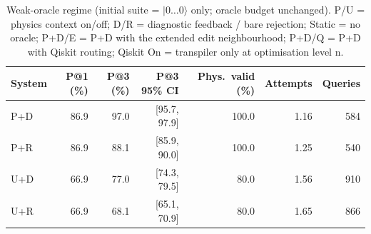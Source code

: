 \begin{table}[t]
\centering
\caption{Weak-oracle regime (initial suite = $|0\ldots0\rangle$ only; oracle budget unchanged). P/U = physics context on/off; D/R = diagnostic feedback / bare rejection; Static = no oracle; P+D/E = P+D with the extended edit neighbourhood; P+D/Q = P+D with Qiskit routing; Qiskit On = transpiler only at optimisation level n.}
\label{tab:weak}
\footnotesize
\setlength{\tabcolsep}{3pt}
\begin{tabular}{lrrrrrr}
\toprule
System & P@1 (\%) & P@3 (\%) & P@3 95\% CI & Phys.\ valid (\%) & Attempts & Queries \\
\midrule
P+D & 86.9 & 97.0 & [95.7, 97.9] & 100.0 & 1.16 & 584 \\
P+R & 86.9 & 88.1 & [85.9, 90.0] & 100.0 & 1.25 & 540 \\
U+D & 66.9 & 77.0 & [74.3, 79.5] & 80.0 & 1.56 & 910 \\
U+R & 66.9 & 68.1 & [65.1, 70.9] & 80.0 & 1.65 & 866 \\
\bottomrule
\end{tabular}
\end{table}
